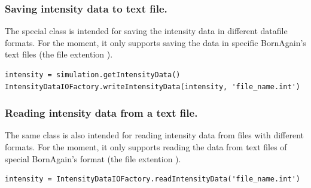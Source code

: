 \subsubsection{Saving intensity data to text file.}

The special class  is intended for saving the intensity data
in different datafile formats. For the moment, it only supports saving the data in specific BornAgain's text files (the file extention ).

\begin{lstlisting}
intensity = simulation.getIntensityData()
IntensityDataIOFactory.writeIntensityData(intensity, 'file_name.int')
\end{lstlisting}

\subsubsection{Reading intensity data from a text file.}
The same class is also intended for reading intensity data
from files with different formats. For the moment, it only supports reading the data from text files of special BornAgain's format (the file extention ).

\begin{lstlisting}
intensity = IntensityDataIOFactory.readIntensityData('file_name.int')
\end{lstlisting}
\fi
